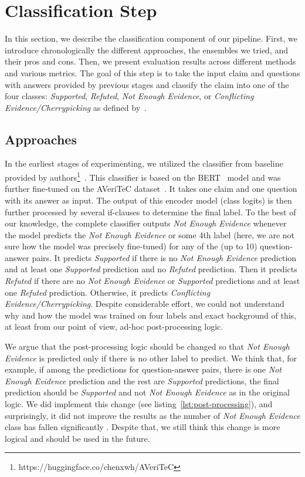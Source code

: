 
\section{Classification Step}
In this section, we describe the classification component of our pipeline. First, we introduce chronologically the different approaches, the ensembles we tried, and their pros and cons. Then, we present evaluation results across different methods and various metrics. The goal of this step is to take the input claim and questions with answers provided by previous stages  and classify the claim into one of the four classes: \textit{Supported}, \textit{Refuted}, \textit{Not Enough Evidence}, or \textit{Conflicting Evidence/Cherrypicking} as defined by~\citealp{averitec2024}.

\subsection{Approaches}

In the earliest stages of experimenting, we utilized the classifier from baseline provided by authors\footnote{https://huggingface.co/chenxwh/AVeriTeC}~\cite{averitec2024}. This classifier is based on the BERT~\cite{devlin-etal-2019-bert} model and was further fine-tuned on the AVeriTeC dataset~\cite{averitec2024}. It takes one claim and one question with its answer as input. The output of this encoder model (class logits) is then further processed by several if-clauses to determine the final label. To the best of our knowledge, the complete classifier outputs \textit{Not Enough Evidence} whenever the model predicts the \textit{Not Enough Evidence} or some 4th label (here, we are not sure how the model was precisely fine-tuned) for any of the (up to 10) question-answer pairs. It predicts \textit{Supported} if there is no \textit{Not Enough Evidence} prediction and at least one \textit{Supported} prediction and no \textit{Refuted} prediction. Then it predicts \textit{Refuted} if there are no \textit{Not Enough Evidence} or \textit{Supported} predictions and at least one \textit{Refuted} prediction. Otherwise, it predicts \textit{Conflicting Evidence/Cherrypicking}. Despite considerable effort, we could not understand why and how the model was trained on four labels and exact background of this, at least from our point of view, ad-hoc post-processing logic.

We argue that the post-processing logic should be changed so that \textit{Not Enough Evidence} is predicted only if there is no other label to predict. We think that, for example, if among the predictions for question-answer pairs, there is one \textit{Not Enough Evidence} prediction and the rest are \textit{Supported} predictions, the final prediction should be \textit{Supported} and not \textit{Not Enough Evidence} as in the original logic. We did implement this change (see listing~\ref{lst:post-processing}), and surprisingly, it did not improve the results as the number of \textit{Not Enough Evidence} class has fallen significantly . Despite that, we still think this change is more logical and should be used in the future.

